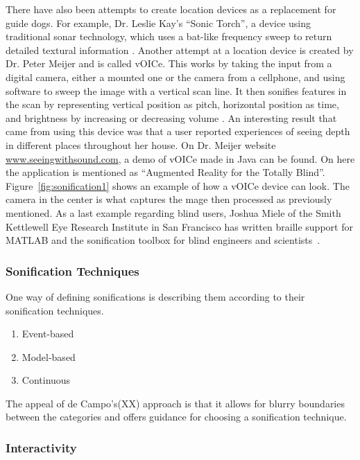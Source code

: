 There have also been attempts to create location devices as a replacement for guide dogs.
For example, Dr. Leslie Kay’s “Sonic Torch”, a device using traditional sonar technology, which uses a bat-like frequency sweep to return detailed textural information \cite*{Girvin2005}.
Another attempt at a location device is created by Dr. Peter Meijer and is called vOICe. 
This works by taking the input from a digital camera, either a mounted one or the camera from a cellphone, and using software to sweep the image with a vertical scan line. 
It then sonifies features in the scan by representing vertical position as pitch, horizontal position as time, and brightness by increasing or decreasing volume \cite*{Girvin2005}. 
An interesting result that came from using this device was that a user reported experiences of seeing depth in different places throughout her house. On Dr. Meijer website \url{www.seeingwithsound.com}, a demo of vOICe made in Java can be found. 
On here the application is mentioned as “Augmented Reality for the Totally Blind”. 
Figure~\ref{fig:sonification1} shows an example of how a vOICe device can look. 
The camera in the center is what captures the mage then processed as previously mentioned.
As a last example regarding blind users, Joshua Miele of the Smith Kettlewell Eye Research Institute in San Francisco has written braille support for MATLAB and the sonification toolbox for blind engineers and scientists~\cite*{Girvin2005}. 



\subsubsection{Sonification Techniques} %
\label{ssub:sonification_techniques}

One way of defining sonifications is describing them according to their sonification techniques.

\begin{enumerate}
    \item Event-based
    \item Model-based
    \item Continuous
\end{enumerate}

The appeal of de Campo’s(XX) approach is that it allows for blurry boundaries between the categories and offers guidance for choosing a sonification technique.


\subsubsection*{Interactivity} %
\label{ssub:interactivity}

